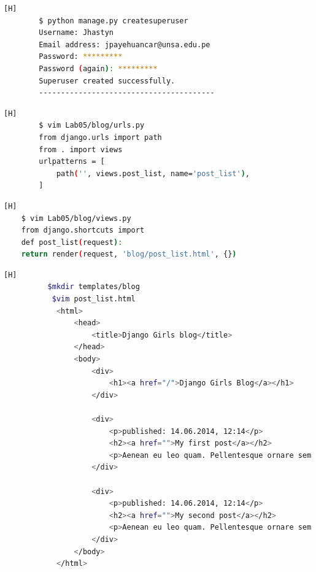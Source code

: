 \documentclass{article}
\begin{document}
        

        \begin{lstlisting}[language=bash,caption={Crear un superusuario (superuser)}][H]            
		$ python manage.py createsuperuser
        Username: Jhastyn
        Email address: jpayehuancar@unsa.edu.pe 
        Password: *********
        Password (again): *********
        Superuser created successfully.
        ----------------------------------------
	\end{lstlisting}

        
        
        \begin{lstlisting}[language=bash,caption={Crear urls.py en el directorio blog}][H]            
		$ vim Lab05/blog/urls.py
        from django.urls import path
        from . import views
        urlpatterns = [
            path('', views.post_list, name='post_list'),
        ]
	\end{lstlisting}
    
        \begin{lstlisting}[language=bash,caption={Agregaremos nuestras views al archivo}][H]            
    $ vim Lab05/blog/views.py
    from django.shortcuts import 
    def post_list(request):
    return render(request, 'blog/post_list.html', {})
	\end{lstlisting}

        \begin{lstlisting}[language=bash,caption={Personalizamos plantilla}][H] 
          $mkdir templates/blog
	       $vim post_list.html
            <html>
                <head>
                    <title>Django Girls blog</title>
                </head>
                <body>
                    <div>
                        <h1><a href="/">Django Girls Blog</a></h1>
                    </div>

                    <div>
                        <p>published: 14.06.2014, 12:14</p>
                        <h2><a href="">My first post</a></h2>
                        <p>Aenean eu leo quam. Pellentesque ornare sem lacinia quam venenatis vestibulum. Donec id elit non mi porta gravida at eget metus. Fusce dapibus, tellus ac cursus commodo, tortor mauris condimentum nibh, ut fermentum massa justo sit amet risus.</p>   
                    </div>

                    <div>
                        <p>published: 14.06.2014, 12:14</p>
                        <h2><a href="">My second post</a></h2>
                        <p>Aenean eu leo quam. Pellentesque ornare sem lacinia quam venenatis vestibulum. Donec id elit non mi porta gravida at eget metus. Fusce dapibus, tellus ac cursus commodo, tortor mauris condimentum nibh, ut f.</p>
                    </div>
                </body>
            </html>
        \end{lstlisting}
\end{document}
